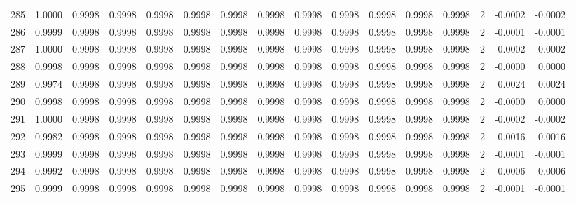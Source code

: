 \begin{tabular}{lrrrrrrrrrrrrrrr}
285 &      1.0000 &  0.9998 &  0.9998 &  0.9998 &  0.9998 &  0.9998 &  0.9998 &  0.9998 &  0.9998 &  0.9998 &   0.9998 &     0.9998 &      2 &                   -0.0002 &                    -0.0002 \\
286 &      0.9999 &  0.9998 &  0.9998 &  0.9998 &  0.9998 &  0.9998 &  0.9998 &  0.9998 &  0.9998 &  0.9998 &   0.9998 &     0.9998 &      2 &                   -0.0001 &                    -0.0001 \\
287 &      1.0000 &  0.9998 &  0.9998 &  0.9998 &  0.9998 &  0.9998 &  0.9998 &  0.9998 &  0.9998 &  0.9998 &   0.9998 &     0.9998 &      2 &                   -0.0002 &                    -0.0002 \\
288 &      0.9998 &  0.9998 &  0.9998 &  0.9998 &  0.9998 &  0.9998 &  0.9998 &  0.9998 &  0.9998 &  0.9998 &   0.9998 &     0.9998 &      2 &                   -0.0000 &                     0.0000 \\
289 &      0.9974 &  0.9998 &  0.9998 &  0.9998 &  0.9998 &  0.9998 &  0.9998 &  0.9998 &  0.9998 &  0.9998 &   0.9998 &     0.9998 &      2 &                    0.0024 &                     0.0024 \\
290 &      0.9998 &  0.9998 &  0.9998 &  0.9998 &  0.9998 &  0.9998 &  0.9998 &  0.9998 &  0.9998 &  0.9998 &   0.9998 &     0.9998 &      2 &                   -0.0000 &                     0.0000 \\
291 &      1.0000 &  0.9998 &  0.9998 &  0.9998 &  0.9998 &  0.9998 &  0.9998 &  0.9998 &  0.9998 &  0.9998 &   0.9998 &     0.9998 &      2 &                   -0.0002 &                    -0.0002 \\
292 &      0.9982 &  0.9998 &  0.9998 &  0.9998 &  0.9998 &  0.9998 &  0.9998 &  0.9998 &  0.9998 &  0.9998 &   0.9998 &     0.9998 &      2 &                    0.0016 &                     0.0016 \\
293 &      0.9999 &  0.9998 &  0.9998 &  0.9998 &  0.9998 &  0.9998 &  0.9998 &  0.9998 &  0.9998 &  0.9998 &   0.9998 &     0.9998 &      2 &                   -0.0001 &                    -0.0001 \\
294 &      0.9992 &  0.9998 &  0.9998 &  0.9998 &  0.9998 &  0.9998 &  0.9998 &  0.9998 &  0.9998 &  0.9998 &   0.9998 &     0.9998 &      2 &                    0.0006 &                     0.0006 \\
295 &      0.9999 &  0.9998 &  0.9998 &  0.9998 &  0.9998 &  0.9998 &  0.9998 &  0.9998 &  0.9998 &  0.9998 &   0.9998 &     0.9998 &      2 &                   -0.0001 &                    -0.0001 \\

\end{tabular}
